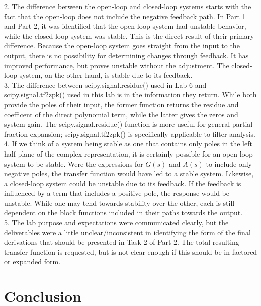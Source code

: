 \documentclass[12pt]{report}
\begin{document}
2. The difference between the open-loop and closed-loop systems starts with the fact that the open-loop does not include the negative feedback path.  In Part 1 and Part 2, it was identified that the open-loop system had unstable behavior, while the closed-loop system was stable. This is the direct result of their primary difference. Because the open-loop system goes straight from the input to the output, there is no possibility for determining changes through feedback. It has improved performance, but proves unstable without the adjustment. The closed-loop system, on the other hand, is stable due to its feedback. \\ 

3. The difference between scipy.signal.residue() used in Lab 6 and
scipy.signal.tf2zpk() used in this lab is in the information they return. While both provide the poles of their input, the former function returns the residue and coefficent of the direct polynomial term, while the latter gives the zeros and system gain. The scipy.signal.residue() function is more useful for general partial fraction expansion; scipy.signal.tf2zpk() is specifically applicable to filter analysis. \\

4. If we think of a system being stable as one that contains only poles in the left half plane of the complex representation, it is certainly possible for an open-loop system to be stable. Were the expressions for $ G(s) $ and $ A(s) $ to include only negative poles, the transfer function would have led to a stable system. Likewise, a closed-loop system could be unstable due to its feedback. If the feedback is influenced by a term that includes a positive pole, the response would be unstable. While one may tend towards stability over the other, each is still dependent on the block functions included in their paths towards the output. \\ 

5. The lab purpose and expectations were communicated clearly, but the deliverables were a little unclear/inconsistent in identifying the form of the final derivations that should be presented in Task 2 of Part 2. The total resulting transfer function is requested, but is not clear enough if this should be in factored or expanded form.

\section{Conclusion}
\end{document}
